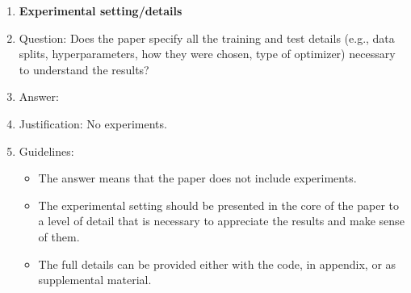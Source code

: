 \documentclass{article}
\numberwithin{theorem}{section}
\theoremstyle{definition}
\begin{document}
\begin{enumerate}
\item {\bf Experimental setting/details}
    \item[] Question: Does the paper specify all the training and test details (e.g., data splits, hyperparameters, how they were chosen, type of optimizer) necessary to understand the results?
    \item[] Answer: \answerNA{} %
    \item[] Justification: No experiments.
    \item[] Guidelines:
    \begin{itemize}
        \item The answer \answerNA{} means that the paper does not include experiments.
        \item The experimental setting should be presented in the core of the paper to a level of detail that is necessary to appreciate the results and make sense of them.
        \item The full details can be provided either with the code, in appendix, or as supplemental material.
    \end{itemize}


\end{enumerate}
\end{document}
